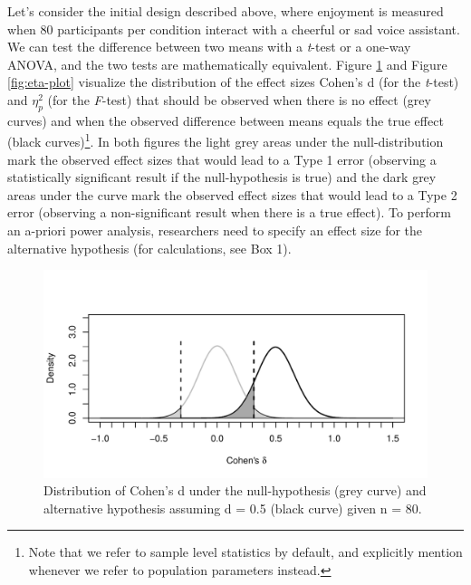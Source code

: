 \documentclass[
  ,jou,floatsintext]{apa6}
\begin{document}
Let's consider the initial design described above, where enjoyment is measured when 80 participants per condition interact with a cheerful or sad voice assistant.
We can test the difference between two means with a \emph{t}-test or a one-way ANOVA, and the two tests are mathematically equivalent.
Figure \ref{fig:d-plot} and Figure \ref{fig:eta-plot} visualize the distribution of the effect sizes Cohen's d (for the \emph{t}-test) and \(\eta_p^2\) (for the \emph{F}-test) that should be observed when there is no effect (grey curves) and when the observed difference between means equals the true effect (black curves)\footnote{Note that we refer to sample level statistics by default, and explicitly mention whenever we refer to population parameters instead.}.
In both figures the light grey areas under the null-distribution mark the observed effect sizes that would lead to a Type 1 error (observing a statistically significant result if the null-hypothesis is true) and the dark grey areas under the curve mark the observed effect sizes that would lead to a Type 2 error (observing a non-significant result when there is a true effect).
To perform an a-priori power analysis, researchers need to specify an effect size for the alternative hypothesis (for calculations, see Box 1).

\begin{figure}
\centering
\includegraphics{0.1_Simulation_Based_Power_Analysis_For_Factorial_ANOVA_Designs_files/figure-latex/d-plot-1.pdf}
\caption{\label{fig:d-plot}Distribution of Cohen's d under the null-hypothesis (grey curve) and alternative hypothesis assuming d = 0.5 (black curve) given n = 80.}
\end{figure}
\end{document}
